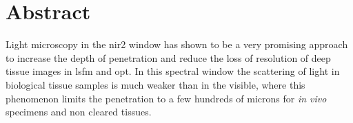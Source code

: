 \chapter*{Abstract}
Light microscopy in the \acrfull{nir2} window has shown to be a very promising approach to increase the depth of penetration and reduce the loss of resolution of deep tissue images in \acrfull{lsfm} and \acrfull{opt}.
In this spectral window the scattering of light in biological tissue samples is much weaker than in the visible, where this phenomenon limits the penetration to a few hundreds of microns for \textit{in vivo} specimens and non cleared tissues.

